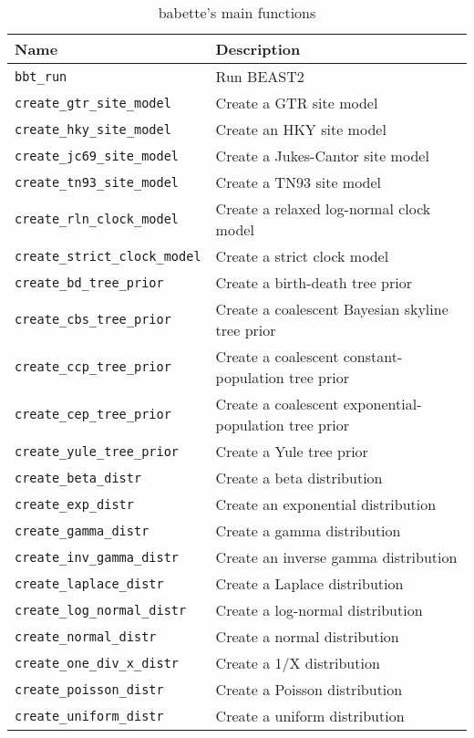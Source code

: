 \documentclass{article}
\begin{document}
\begin{table}[h]
\centering
\begin{tabular}{ | l | l | }
\hline
\textbf{Name} & \textbf{Description} \\
\hline
\verb;bbt_run; & Run BEAST2 \\
\hline
\verb;create_gtr_site_model; & Create a GTR site model \\
\verb;create_hky_site_model; & Create an HKY site model \\
\verb;create_jc69_site_model; & Create a Jukes-Cantor site model \\
\verb;create_tn93_site_model; & Create a TN93 site model \\
\hline
\verb;create_rln_clock_model; & Create a relaxed log-normal clock model \\
\verb;create_strict_clock_model; & Create a strict clock model \\
\hline
\verb;create_bd_tree_prior; & Create a birth-death tree prior \\
\verb;create_cbs_tree_prior; & Create a coalescent Bayesian skyline tree prior \\
\verb;create_ccp_tree_prior; & Create a coalescent constant-population tree prior \\
\verb;create_cep_tree_prior; & Create a coalescent exponential-population tree prior \\
\verb;create_yule_tree_prior; & Create a Yule tree prior \\
\hline
\verb;create_beta_distr; & Create a beta distribution \\
\verb;create_exp_distr; & Create an exponential distribution \\
\verb;create_gamma_distr; & Create a gamma distribution \\
\verb;create_inv_gamma_distr; & Create an inverse gamma distribution \\
\verb;create_laplace_distr; & Create a Laplace distribution \\
\verb;create_log_normal_distr; & Create a log-normal distribution \\
\verb;create_normal_distr; & Create a normal distribution \\
\verb;create_one_div_x_distr; & Create a 1/X distribution \\
\verb;create_poisson_distr; & Create a Poisson distribution \\
\verb;create_uniform_distr; & Create a uniform distribution \\
\hline
\end{tabular}
\caption{babette's main functions}
\label{tab:functions}
\end{table}
\end{document}
